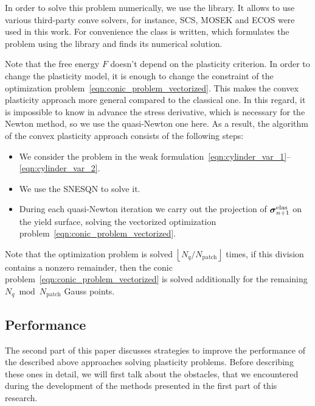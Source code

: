 \documentclass[12pt]{article}
\begin{document}
In order to solve this problem numerically, we use the  library. It allows to use various third-party conve solvers, for instance, SCS, MOSEK and ECOS were used in this work. For convenience the  class is written, which formulates the problem using the  library and finds its numerical solution.

Note that the free energy $F$ doesn't depend on the plasticity criterion. In order to change the plasticity model, it is enough to change the constraint of the optimization problem~\ref{eqn:conic_problem_vectorized}. This makes the convex plasticity approach more general compared to the classical one. In this regard, it is impossible to know in advance the stress derivative, which is necessary for the Newton method, so we use the quasi-Newton one here. As a result, the algorithm of the convex plasticity approach consists of the following steps:
\begin{itemize}
    \item We consider the problem in the weak formulation~\ref{eqn:cylinder_var_1}--\ref{eqn:cylinder_var_2}.
    \item We use the SNESQN  to solve it.
    \item During each quasi-Newton iteration we carry out the projection of $\mbox{\boldmath$\sigma$}^\text{elas}_{n+1}$ on the yield surface, solving the vectorized optimization problem~\ref{eqn:conic_problem_vectorized}.
\end{itemize}
Note that the optimization problem is solved $\left\lfloor N_q / N_\text{patch}\right\rfloor$ times, if this division contains a nonzero remainder, then the conic problem~\ref{eqn:conic_problem_vectorized} is solved additionally for the remaining $N_q \bmod N_\text{patch}$ Gauss points. 

\subsection{Performance}

The second part of this paper discusses strategies to improve the performance of the described above approaches solving plasticity problems. Before describing these ones in detail, we will first talk about the obstacles, that we encountered during the development of the methods presented in the first part of this research. 

\end{document}
